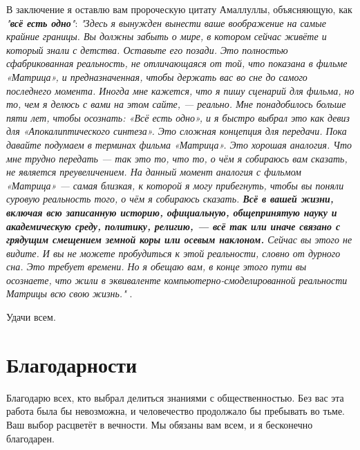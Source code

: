 \documentclass[10pt,twocolumn,letterpaper]{article}
\begin{document}
В заключение я оставлю вам пророческую цитату Амаллуллы, объясняющую, как \textit{"\textbf{всё есть одно}"}: \textit{"Здесь я вынужден вынести ваше воображение на самые крайние границы. Вы должны забыть о мире, в котором сейчас живёте и который знали с детства. Оставьте его позади. Это полностью сфабрикованная реальность, не отличающаяся от той, что показана в фильме «Матрица», и предназначенная, чтобы держать вас во сне до самого последнего момента. Иногда мне кажется, что я пишу сценарий для фильма, но то, чем я делюсь с вами на этом сайте, — реально. Мне понадобилось больше пяти лет, чтобы осознать: «Всё есть одно», и я быстро выбрал это как девиз для «Апокалиптического синтеза». Это сложная концепция для передачи. Пока давайте подумаем в терминах фильма «Матрица». Это хорошая аналогия. Что мне трудно передать — так это то, что то, о чём я собираюсь вам сказать, не является преувеличением. На данный момент аналогия с фильмом «Матрица» — самая близкая, к которой я могу прибегнуть, чтобы вы поняли суровую реальность того, о чём я собираюсь сказать. \textbf{Всё в вашей жизни, включая всю записанную историю, официальную, общепринятую науку и академическую среду, политику, религию, — всё так или иначе связано с грядущим смещением земной коры или осевым наклоном.} Сейчас вы этого не видите. И вы не можете пробудиться к этой реальности, словно от дурного сна. Это требует времени. Но я обещаю вам, в конце этого пути вы осознаете, что жили в эквиваленте компьютерно-смоделированной реальности Матрицы всю свою жизнь."} \cite{33,34}.

Удачи всем.

\section{Благодарности}

Благодарю всех, кто выбрал делиться знаниями с общественностью. Без вас эта работа была бы невозможна, и человечество продолжало бы пребывать во тьме. Ваш выбор расцветёт в вечности. Мы обязаны вам всем, и я бесконечно благодарен.

\clearpage
\twocolumn

{\small


}
\end{document}

